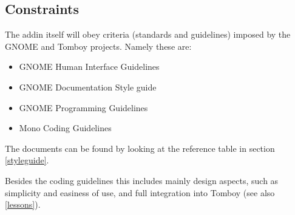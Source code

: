 \subsection{Constraints}
\label{description:constraints}
The addin itself will obey criteria (standards and guidelines) imposed by the GNOME and Tomboy projects.
Namely these are:
\begin{itemize}
 \item GNOME Human Interface Guidelines
 \item GNOME Documentation Style guide %
 \item GNOME Programming Guidelines
 \item Mono Coding Guidelines
\end{itemize}
The documents can be found by looking at the reference table in section \ref{styleguide}.

Besides the coding guidelines this includes mainly design aspects, such as simplicity and easiness of use, and full integration into Tomboy (see also \ref{lessons}).
